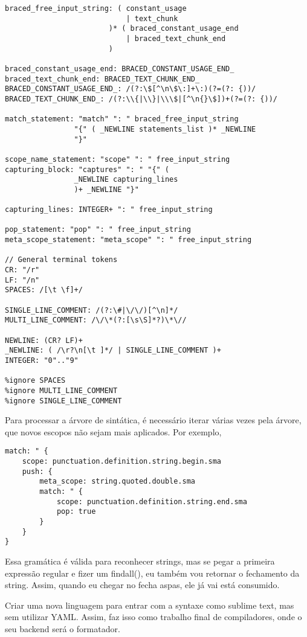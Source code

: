 \begin{lstlisting}
braced_free_input_string: ( constant_usage
                            | text_chunk
                        )* ( braced_constant_usage_end
                            | braced_text_chunk_end
                        )

braced_constant_usage_end: BRACED_CONSTANT_USAGE_END_
braced_text_chunk_end: BRACED_TEXT_CHUNK_END_
BRACED_CONSTANT_USAGE_END_: /(?:\$[^\n\$\:]+\:)(?=(?: {))/
BRACED_TEXT_CHUNK_END_: /(?:\\{|\\}|\\\$|[^\n{}\$])+(?=(?: {))/

match_statement: "match" ": " braced_free_input_string
                "{" ( _NEWLINE statements_list )* _NEWLINE
                "}"

scope_name_statement: "scope" ": " free_input_string
capturing_block: "captures" ": " "{" (
                _NEWLINE capturing_lines
                )+ _NEWLINE "}"

capturing_lines: INTEGER+ ": " free_input_string

pop_statement: "pop" ": " free_input_string
meta_scope_statement: "meta_scope" ": " free_input_string

// General terminal tokens
CR: "/r"
LF: "/n"
SPACES: /[\t \f]+/

SINGLE_LINE_COMMENT: /(?:\#|\/\/)[^\n]*/
MULTI_LINE_COMMENT: /\/\*(?:[\s\S]*?)\*\//

NEWLINE: (CR? LF)+
_NEWLINE: ( /\r?\n[\t ]*/ | SINGLE_LINE_COMMENT )+
INTEGER: "0".."9"

%ignore SPACES
%ignore MULTI_LINE_COMMENT
%ignore SINGLE_LINE_COMMENT
\end{lstlisting}


Para processar a árvore de sintática, é necessário iterar várias vezes pela árvore, que novos escopos não sejam mais aplicados.
Por exemplo,
\begin{lstlisting}
match: " {
    scope: punctuation.definition.string.begin.sma
    push: {
        meta_scope: string.quoted.double.sma
        match: " {
            scope: punctuation.definition.string.end.sma
            pop: true
        }
    }
}
\end{lstlisting}
Essa gramática é válida para reconhecer strings, mas se pegar a primeira expressão
regular e fizer um findall(), eu também vou retornar o fechamento da string.
Assim, quando eu chegar no fecha aspas, ele já vai está consumido.

Criar uma nova linguagem para entrar com a syntaxe como sublime text, mas sem utilizar YAML.
Assim, faz isso como trabalho final de compiladores, onde o seu backend será o formatador.


